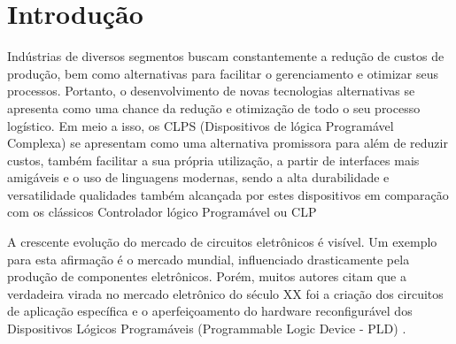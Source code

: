 \section{\esp Introdução} 

Indústrias de diversos segmentos buscam constantemente a redução de custos de produção, bem como alternativas para facilitar o gerenciamento e otimizar seus processos. Portanto, o desenvolvimento de novas tecnologias alternativas se apresenta como uma chance da redução e otimização de todo o seu processo logístico. Em meio a isso, os CLPS (Dispositivos de lógica Programável Complexa) se apresentam como uma alternativa promissora para além de reduzir custos, também facilitar a sua própria utilização, a partir de interfaces mais amigáveis e o uso de linguagens modernas, sendo a alta durabilidade e versatilidade qualidades também alcançada por estes dispositivos em comparação com os clássicos Controlador lógico Programável ou CLP
\cite{Freitas2015}

\begin{citacaodireta}
A crescente evolução do mercado de circuitos eletrônicos é visível. Um exemplo para esta afirmação é o mercado mundial, influenciado drasticamente pela produção de componentes eletrônicos. Porém, muitos autores citam que a verdadeira virada no mercado eletrônico do século XX foi a criação dos circuitos de aplicação específica e o aperfeiçoamento do hardware reconfigurável dos Dispositivos Lógicos Programáveis (Programmable Logic Device - PLD) 
\cite[25]{Oliveira2011}.
\end{citacaodireta}

